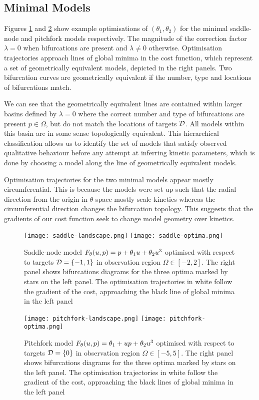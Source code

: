 \subsection{Minimal Models}
Figures \ref{fig:saddle-node:results} and \ref{fig:pitchfork:results} show example optimisations of $(\theta_1,\theta_2)$ for the minimal saddle-node and pitchfork models respectively. The magnitude of the correction factor $\lambda=0$ when bifurcations are present and $\lambda\neq0$ otherwise. Optimisation trajectories approach lines of global minima in the cost function, which represent a set of geometrically equivalent models, depicted in the right panels. Two bifurcation curves are geometrically equivalent if the number, type and locations of bifurcations match.

We can see that the geometrically equivalent lines are contained within larger basins defined by $\lambda=0$ where the correct number and type of bifurcations are present $p\in\Omega$, but do not match the locations of targets $\mathcal{D}$. All models within this basin are in some sense topologically equivalent. This hierarchical classification allows us to identify the set of models that satisfy observed qualitative behaviour \cite{Stumpf2019ParameterBifurcations} before any attempt at inferring kinetic parameters, which is done by choosing a model along the line of geometrically equivalent models.

Optimisation trajectories for the two minimal models appear mostly circumferential. This is because the models were set up such that the radial direction from the origin in $\theta$ space mostly scale kinetics whereas the circumferential direction changes the bifurcation topology. This suggests that the gradients of our cost function seek to change model geometry over kinetics.

\begin{figure}
\centering
\texttt{[image: saddle-landscape.png]}
\texttt{[image: saddle-optima.png]}
\caption{Saddle-node model $F_{\theta}(u,p) = p + \theta_{1}u+\theta_{2}u^3$ optimised with respect to targets $\mathcal{D}=\{-1,1\}$ in observation region $\Omega\in[-2,2]$. The right panel shows bifurcations diagrams for the three optima marked by stars on the left panel. The optimisation trajectories in white follow the gradient of the cost, approaching the black line of global minima in the left panel}
\label{fig:saddle-node:results}
\end{figure}

\begin{figure}
\centering
\texttt{[image: pitchfork-landscape.png]}
\texttt{[image: pitchfork-optima.png]}
\caption{Pitchfork model $F_{\theta}(u,p) = \theta_{1} + u p +\theta_{2}u^3$ optimised with respect to targets $\mathcal{D}=\{0\}$ in observation region $\Omega\in[-5,5]$. The right panel shows bifurcations diagrams for the three optima marked by stars on the left panel. The optimisation trajectories in white follow the gradient of the cost, approaching the black lines of global minima in the left panel}
\label{fig:pitchfork:results}
\end{figure}

